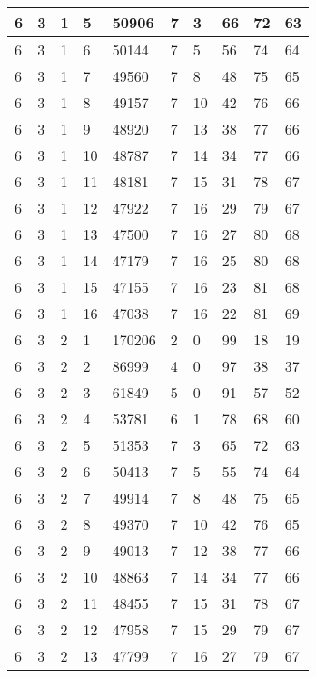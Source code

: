 \begin{table}[!ht]
\begin{tabular}{|l|l|l|l|l|l|l|l|l|l|}
        6 & 3 & 1 & 5 & 50906 & 7 & 3 & 66 & 72 & 63 \\ \hline
        6 & 3 & 1 & 6 & 50144 & 7 & 5 & 56 & 74 & 64 \\ \hline
        6 & 3 & 1 & 7 & 49560 & 7 & 8 & 48 & 75 & 65 \\ \hline
        6 & 3 & 1 & 8 & 49157 & 7 & 10 & 42 & 76 & 66 \\ \hline
        6 & 3 & 1 & 9 & 48920 & 7 & 13 & 38 & 77 & 66 \\ \hline
        6 & 3 & 1 & 10 & 48787 & 7 & 14 & 34 & 77 & 66 \\ \hline
        6 & 3 & 1 & 11 & 48181 & 7 & 15 & 31 & 78 & 67 \\ \hline
        6 & 3 & 1 & 12 & 47922 & 7 & 16 & 29 & 79 & 67 \\ \hline
        6 & 3 & 1 & 13 & 47500 & 7 & 16 & 27 & 80 & 68 \\ \hline
        6 & 3 & 1 & 14 & 47179 & 7 & 16 & 25 & 80 & 68 \\ \hline
        6 & 3 & 1 & 15 & 47155 & 7 & 16 & 23 & 81 & 68 \\ \hline
        6 & 3 & 1 & 16 & 47038 & 7 & 16 & 22 & 81 & 69 \\ \hline
        6 & 3 & 2 & 1 & 170206 & 2 & 0 & 99 & 18 & 19 \\ \hline
        6 & 3 & 2 & 2 & 86999 & 4 & 0 & 97 & 38 & 37 \\ \hline
        6 & 3 & 2 & 3 & 61849 & 5 & 0 & 91 & 57 & 52 \\ \hline
        6 & 3 & 2 & 4 & 53781 & 6 & 1 & 78 & 68 & 60 \\ \hline
        6 & 3 & 2 & 5 & 51353 & 7 & 3 & 65 & 72 & 63 \\ \hline
        6 & 3 & 2 & 6 & 50413 & 7 & 5 & 55 & 74 & 64 \\ \hline
        6 & 3 & 2 & 7 & 49914 & 7 & 8 & 48 & 75 & 65 \\ \hline
        6 & 3 & 2 & 8 & 49370 & 7 & 10 & 42 & 76 & 65 \\ \hline
        6 & 3 & 2 & 9 & 49013 & 7 & 12 & 38 & 77 & 66 \\ \hline
        6 & 3 & 2 & 10 & 48863 & 7 & 14 & 34 & 77 & 66 \\ \hline
        6 & 3 & 2 & 11 & 48455 & 7 & 15 & 31 & 78 & 67 \\ \hline
        6 & 3 & 2 & 12 & 47958 & 7 & 15 & 29 & 79 & 67 \\ \hline
        6 & 3 & 2 & 13 & 47799 & 7 & 16 & 27 & 79 & 67 \\ \hline

\end{tabular}
\end{table}
